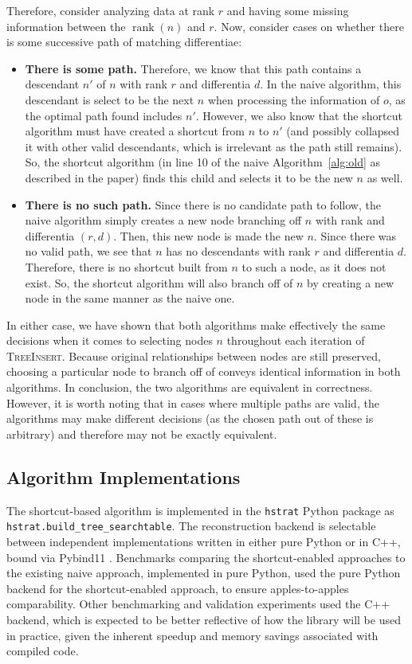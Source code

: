 Therefore, consider analyzing data at rank $r$ and having some missing information between the $\operatorname{rank}(n)$ and $r$.
Now, consider cases on whether there is some successive path of matching differentiae:

\begin{itemize}
  \item \textbf{There is some path.}
  Therefore, we know that this path contains a descendant $n'$ of $n$ with rank $r$ and differentia $d$.
  In the naive algorithm, this descendant is select to be the next $n$ when processing the information of $o$, as the optimal path found includes $n'$.
  However, we also know that the shortcut algorithm must have created a shortcut from $n$ to $n'$ (and possibly collapsed it with other valid descendants, which is irrelevant as the path still remains).
  So, the shortcut algorithm (in line 10 of the naive Algorithm~\ref{alg:old} as described in the paper) finds this child and selects it to be the new $n$ as well.
  \item \textbf{There is no such path.}
  Since there is no candidate path to follow, the naive algorithm simply creates a new node branching off $n$ with rank and differentia $(r, d)$.
  Then, this new node is made the new $n$.
  Since there was no valid path, we see that $n$ has no descendants with rank $r$ and differentia $d$.
  Therefore, there is no shortcut built from $n$ to such a node, as it does not exist.
  So, the shortcut algorithm will also branch off of $n$ by creating a new node in the same manner as the naive one.
\end{itemize}

In either case, we have shown that both algorithms make effectively the same decisions when it comes to selecting nodes $n$ throughout each iteration of \textsc{TreeInsert}.
Because original relationships between nodes are still preserved, choosing a particular node to branch off of conveys identical information in both algorithms.
In conclusion, the two algorithms are equivalent in correctness.
However, it is worth noting that in cases where multiple paths are valid, the algorithms may make different decisions (as the chosen path out of these is arbitrary) and therefore may not be exactly equivalent.

\subsection{Algorithm Implementations}

The shortcut-based algorithm is implemented in the \texttt{hstrat} Python package \citep{moreno2022hstrat} as \texttt{hstrat.build\_tree\_searchtable}.
The reconstruction backend is selectable between independent implementations written in either pure Python or in C++, bound via Pybind11 \citep{pybind11}.
Benchmarks comparing the shortcut-enabled approaches to the existing naive approach, implemented in pure Python, used the pure Python backend for the shortcut-enabled approach, to ensure apples-to-apples comparability.
Other benchmarking and validation experiments used the C++ backend, which is expected to be better reflective of how the library will be used in practice, given the inherent speedup and memory savings associated with compiled code.

